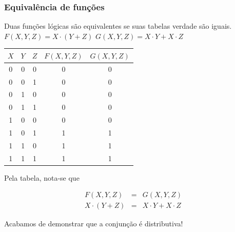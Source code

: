 \documentclass{beamer}
\begin{document}
\begin{frame}
 \frametitle{Equivalência de funções}

Duas funções lógicas são equivalentes se suas tabelas verdade são iguais.\\[6pt]

$F(X,Y,Z) = X \cdot (Y + Z)$ \;\;\;\;\;\;\;\; $G(X,Y,Z) = X \cdot Y + X \cdot Z$

\begin{center}
\begin{tabular}{ccc||c|c}
 $X$ & $Y$ & $Z$ & $F(X,Y,Z)$ & $G(X,Y,Z)$ \\
\hline
 0   &   0 &   0 &  0 & 0 \\

 0   &   0 &   1 &  0 & 0 \\

 0   &   1 &   0 & 0 & 0\\
 0   &   1 &   1 & 0 & 0\\

 1   &   0 &   0 &  0 & 0\\

 1   &   0 &   1 &  1 & 1\\

 1   &   1 &   0 &  1& 1 \\

 1   &   1 &   1 &  1 & 1
\end{tabular}
\end{center}

\pause

Pela tabela, nota-se que

\vspace{-18pt}

\begin{eqnarray*}
F(X,Y,Z)        & = & G(X,Y,Z) \\
X \cdot (Y + Z) & = & X\cdot Y + X \cdot Z
\end{eqnarray*}

\vspace{-6pt}

\pause

Acabamos de demonstrar que a conjunção é distributiva!

\end{frame}

\end{document}
